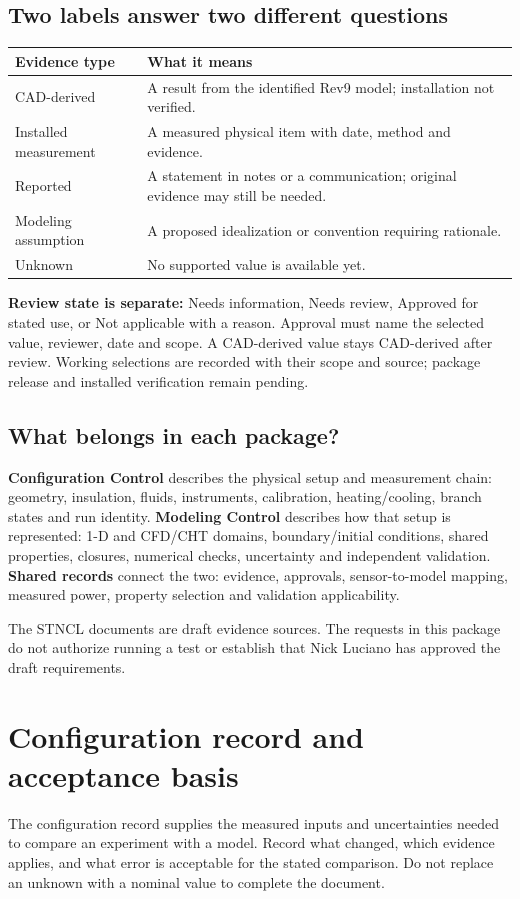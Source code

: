 \documentclass[11pt]{article}
\newcommand{\notebox}[1]{\par\noindent\colorbox{pale}{\parbox{\dimexpr\linewidth-2\fboxsep\relax}{#1}}\par}
\begin{document}
\subsection*{Two labels answer two different questions}
\small\setlength{\tabcolsep}{4pt}
\begin{longtable}{>{\raggedright\arraybackslash}p{}>{\raggedright\arraybackslash}p{}}
\toprule
\textbf{Evidence type} & \textbf{What it means} \\\midrule\endhead
CAD-derived & A result from the identified Rev9 model; installation not verified. \\[3pt]
Installed measurement & A measured physical item with date, method and evidence. \\[3pt]
Reported & A statement in notes or a communication; original evidence may still be needed. \\[3pt]
Modeling assumption & A proposed idealization or convention requiring rationale. \\[3pt]
Unknown & No supported value is available yet. \\[3pt]
\bottomrule\end{longtable}\normalsize
\textbf{Review state is separate:} Needs information, Needs review, Approved for stated use, or Not applicable with a reason. Approval must name the selected value, reviewer, date and scope. A CAD-derived value stays CAD-derived after review. Working selections are recorded with their scope and source; package release and installed verification remain pending.
\subsection*{What belongs in each package?}
\textbf{Configuration Control} describes the physical setup and measurement chain: geometry, insulation, fluids, instruments, calibration, heating/cooling, branch states and run identity.
\textbf{Modeling Control} describes how that setup is represented: 1-D and CFD/CHT domains, boundary/initial conditions, shared properties, closures, numerical checks, uncertainty and independent validation.
\textbf{Shared records} connect the two: evidence, approvals, sensor-to-model mapping, measured power, property selection and validation applicability.
\notebox{The STNCL documents are draft evidence sources. The requests in this package do not authorize running a test or establish that Nick Luciano has approved the draft requirements.}
\par
\clearpage\section{Configuration record and acceptance basis}\label{configuration-record}
\begingroup\small
The configuration record supplies the measured inputs and uncertainties needed to compare an experiment with a model. Record what changed, which evidence applies, and what error is acceptable for the stated comparison. Do not replace an unknown with a nominal value to complete the document.
\end{document}
